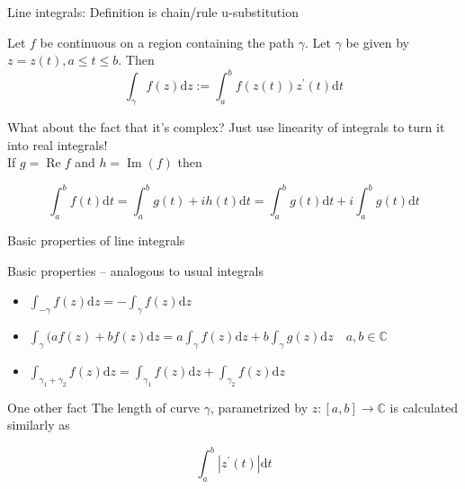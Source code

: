\documentclass{beamer}
\newcommand{\C}{\mathbb{C}}
\DeclareMathOperator{\Real}{Re}
\DeclareMathOperator{\Imag}{Im}
\begin{document}
\begin{frame}{Line integrals: Definition is chain/rule u-substitution}

\begin{definition}
Let $f$ be continuous on a region containing the path $\gamma$.  Let $\gamma$ be given by $z=z(t), a\leq t\leq b$.  Then 
$$\int_\gamma f(z)\text{d}z := \int_a^b f(z(t))z^\prime(t)\text{d}t$$
\end{definition}

\begin{block}{What about the fact that it's complex?}
  Just use linearity of integrals to turn it into real integrals! \\
  If $g=\Real{f}$ and $h=\Imag(f)$ then
  
$$\int_a^b f(t)\text{d}t=\int_a^bg(t)+ih(t)\text{d}t=\int_a^b g(t)\text{d}t+i\int_a^b g(t)\text{d}t$$
\end{block}
\end{frame}
\begin{frame}{Basic properties of line integrals}
\begin{block}{Basic properties -- analogous to usual integrals}
\begin{itemize}
    \item $\int_{-\gamma}f(z)\text{d}z=-\int_\gamma f(z)\text{d}z$
    \item $\int_{\gamma}(af(z)+bf(z)\text{d}z=a\int_\gamma f(z)\text{d}z+b\int_\gamma g(z)\text{d} z\quad a,b\in\C$
\item $\int_{\gamma_1+\gamma_2}f(z)\text{d}z=\int_{\gamma_1} f(z)\text{d}z+\int_{\gamma_2}f(z)\text{d}z$
\end{itemize}
 \end{block}
\begin{block}{One other fact}
  The length of curve $\gamma$, parametrized by $z:[a,b]\to \C$ is calculated similarly as

  $$\int_a^b |z^\prime(t)|\text{d}t$$
\end{block}
\end{frame}
\end{document}
